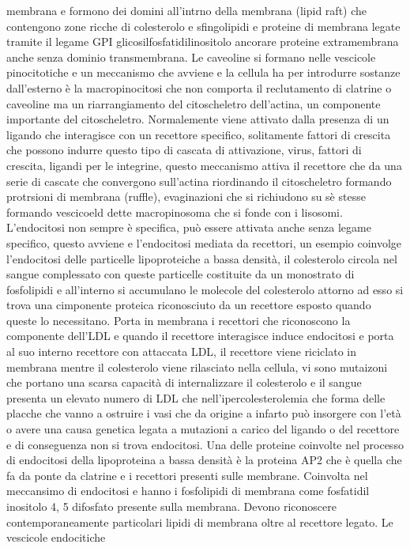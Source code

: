 membrana e formono dei domini all'intrno della membrana (lipid raft) che contengono zone ricche di colesterolo e sfingolipidi e proteine di membrana legate tramite il legame GPI
glicosilfosfatidilinositolo ancorare proteine extramembrana anche senza dominio transmembrana. Le caveoline si formano nelle vescicole pinocitotiche e un meccanismo che avviene e 
la cellula ha per introdurre sostanze dall'esterno \`e la macropinocitosi che non comporta il reclutamento di clatrine o caveoline ma un riarrangiamento del citoscheletro dell'actina, 
un componente importante del citoscheletro. Normalemente viene attivato dalla presenza di un ligando che interagisce con un recettore specifico, solitamente fattori di crescita che 
possono indurre questo tipo di cascata di attivazione, virus, fattori di crescita, ligandi per le integrine, questo meccanismo attiva il recettore che da una serie di cascate 
che convergono sull'actina riordinando il citoscheletro formando protrsioni di membrana (ruffle), evaginazioni che si richiudono su s\`e stesse formando vescicoeld dette macropinosoma che
si fonde con i lisosomi. L'endocitosi non sempre \`e specifica, pu\`o essere attivata anche senza legame specifico, questo avviene e l'endocitosi mediata da recettori, un esempio 
coinvolge l'endocitosi delle particelle lipoproteiche a bassa densit\`a, il colesterolo circola nel sangue complessato con queste particelle costituite da un monostrato di fosfolipidi e 
all'interno si accumulano le molecole del colesterolo attorno ad esso si trova una cimponente proteica riconosciuto da un recettore esposto quando queste lo necessitano. Porta in membrana
i recettori che riconoscono la componente dell'LDL e quando il recettore interagisce induce endocitosi e porta al suo interno recettore con attaccata LDL, il recettore viene riciclato
in membrana mentre il colesterolo viene rilasciato nella cellula, vi sono mutaizoni che portano una scarsa capacit\`a di internalizzare il colesterolo e il sangue presenta un elevato
numero di LDL che nell'ipercolesterolemia che forma delle placche che vanno a ostruire i vasi che da origine a infarto pu\`o insorgere con l'et\`a o avere una causa genetica legata a 
mutazioni a carico del ligando o del recettore e di conseguenza non si trova endocitosi. Una delle proteine coinvolte nel processo di endocitosi della lipoproteina a bassa densit\`a \`e 
la proteina AP2 che \`e quella che fa da ponte da clatrine e i recettori presenti sulle membrane. Coinvolta nel meccansimo di endocitosi e hanno i fosfolipidi di membrana come
fosfatidil inositolo 4, 5 difosfato presente sulla membrana. Devono riconoscere contemporaneamente particolari lipidi di membrana oltre al recettore legato. Le vescicole endocitiche
